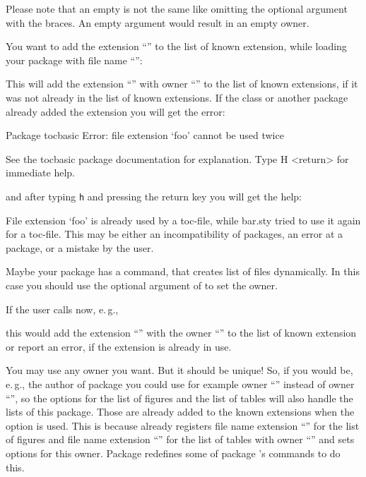Please note that an empty  is not the same
like omitting the optional argument with the braces. An empty argument would
result in an empty owner.
\begin{Example}
  You want to add the extension ``'' to the list of known extension,
  while loading your package with file name ``'':
\begin{lstcode}
\end{lstcode}%
  This will add the extension ``'' with owner ``''
  to the list of known extensions, if it was not already in the list of known
  extensions. If the class or another package already added the extension you
  will get the error:
\begin{lstoutput}
  Package tocbasic Error: file extension `foo' cannot be used twice

  See the tocbasic package documentation for explanation.
  Type  H <return>  for immediate help.
\end{lstoutput}
  and after typing \texttt{h} and pressing the return key you will get the
  help:
\begin{lstoutput}
  File extension `foo' is already used by a toc-file, while bar.sty
  tried to use it again for a toc-file.
  This may be either an incompatibility of packages, an error at a package,
  or a mistake by the user.
\end{lstoutput}

  Maybe your package has a command, that creates list of files dynamically. In 
  this case you should use the optional argument of  to
  set the owner.
\begin{lstcode}
  \newcommand*{\createnewlistofsomething}[1]{%
    \addtotoclist[bar.sty]{#1}%
  }
\end{lstcode}
  If the user calls now, e.\,g.,
\begin{lstcode}
\end{lstcode}
  this would add the extension ``'' with the owner
  ``'' to the list of known extension or report an error, if
  the extension is already in use.
\end{Example}
You may use any owner you want.  But it should be unique!  So, if you would
be, e.\,g., the author of package  you could use for example
owner ``'' instead of owner ``'', so the
\KOMAScript{} options for the list of figures and the list of tables will also
handle the lists of this package. Those are already added to the known
extensions when the option is used. This is because \KOMAScript{} already
registers file name extension ``'' for the list of figures and
file name extension ``'' for the list of tables with owner
``'' and sets options for this owner. Package 
redefines some of package 's commands to do this.%
%

